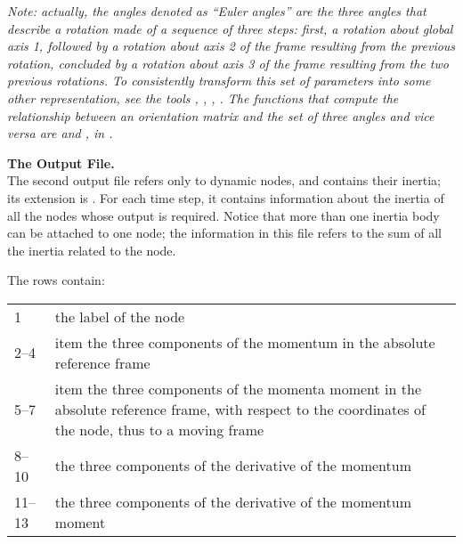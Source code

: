 \emph{Note: actually, the angles denoted as ``Euler angles'' 
are the three angles that describe a rotation made of a sequence
of three steps: first, a rotation about global axis 1,
followed by a rotation about axis 2 of the frame resulting from
the previous rotation, concluded by a rotation about axis 3
of the frame resulting from the two previous rotations.
To consistently transform this set of parameters into some other
representation, see the tools
, , , .
The functions that compute the relationship between an orientation
matrix and the set of three angles and vice versa are
 and , in .
}

\textbf{The  Output File.} \\
The second output file refers only to dynamic nodes, and contains their
inertia; its extension is .
For each time step, it contains information about the inertia of all the
nodes whose output is required.
Notice that more than one inertia body can be attached to one node; the
information in this file refers to the sum of all the inertia related to
the node.

The rows contain: \vspace{2mm} \\
\begin{tabular}{lp{140mm}}
        \hline
	1	& the label of the node \\
	2--4	& item the three components of the momentum
		in the absolute reference frame \\
	5--7	& item the three components of the momenta moment
		in the absolute reference frame,
		with respect to the coordinates of the node, 
		thus to a moving frame \\
    	8--10	& the three components of the derivative of the momentum \\
    	11--13	& the three components of the derivative of the momentum moment \\
	\hline
\end{tabular}\vspace{2mm}\\

